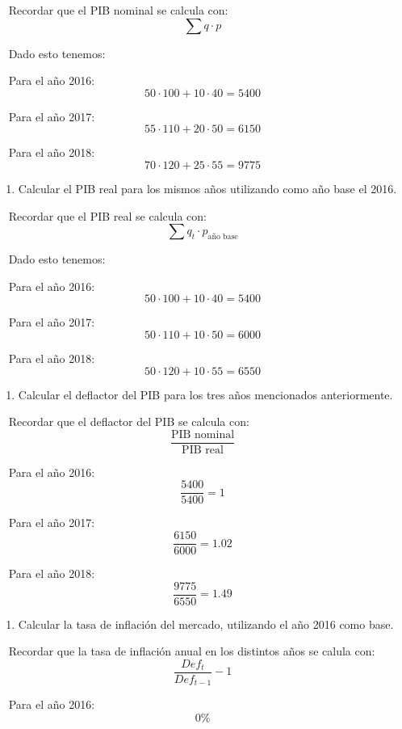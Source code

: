 \documentclass[
  letterpaper,
  DIV=11,
  numbers=noendperiod]{scrreport}
\providecommand{\tightlist}{%
  \setlength{\itemsep}{0pt}\setlength{\parskip}{0pt}}\usepackage{longtable,booktabs,array}
\begin{document}
~ Recordar que el PIB nominal se calcula con: \[
\sum q\cdot p
\]

~ Dado esto tenemos:

~ Para el año 2016: \[
50\cdot 100 + 10 \cdot 40 = 5400
\]

~ Para el año 2017: \[
55\cdot 110 + 20 \cdot 50 = 6150
\]

~ Para el año 2018: \[
70\cdot 120 + 25 \cdot 55 = 9775
\]

\begin{enumerate}
\def\labelenumi{\arabic{enumi})}
\setcounter{enumi}{1}
\tightlist
\item
  Calcular el PIB real para los mismos años utilizando como año base el
  2016.
\end{enumerate}

~ Recordar que el PIB real se calcula con: \[
\sum q_t\cdot p_{\text{año base}}
\]

~ Dado esto tenemos:

~ Para el año 2016: \[
50\cdot 100 + 10 \cdot 40 = 5400
\]

~ Para el año 2017: \[
50\cdot 110 + 10 \cdot 50 = 6000
\]

~ Para el año 2018: \[
50\cdot 120 + 10 \cdot 55 = 6550
\]

\begin{enumerate}
\def\labelenumi{\arabic{enumi})}
\setcounter{enumi}{2}
\tightlist
\item
  Calcular el deflactor del PIB para los tres años mencionados
  anteriormente.
\end{enumerate}

~ Recordar que el deflactor del PIB se calcula con: \[
\frac{\text{PIB nominal}}{\text{PIB real}}
\]

~ Para el año 2016: \[
\frac{5400}{5400}=1
\]

~ Para el año 2017: \[
\frac{6150}{6000}=1.02
\]

~ Para el año 2018: \[
\frac{9775}{6550}=1.49
\]

\begin{enumerate}
\def\labelenumi{\arabic{enumi})}
\setcounter{enumi}{3}
\tightlist
\item
  Calcular la tasa de inflación del mercado, utilizando el año 2016 como
  base.
\end{enumerate}

~ Recordar que la tasa de inflación anual en los distintos años se
calula con: \[
\frac{Def_{t}}{Def_{t-1}}-1
\]

~ Para el año 2016: \[
0\%
\]
\end{document}
